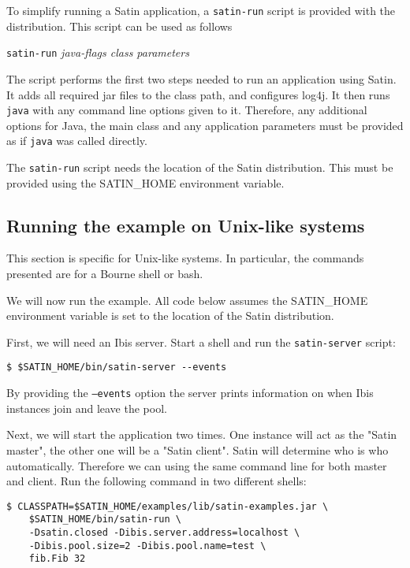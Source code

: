 \documentclass[a4paper,10pt]{article}
\begin{document}
To simplify running a Satin application, a \texttt{satin-run} script is
provided with the distribution. This script can be
used as follows

\begin{center}
\texttt{satin-run} \emph{java-flags class parameters}
\end{center}

The script performs the first two steps needed to run an application
using Satin. It adds all required jar files
to the class path, and configures log4j.
It then runs \texttt{java} with any
command line options given to it. Therefore, any additional options for
Java, the main class and any application parameters must be provided as
if \texttt{java} was called directly.

The \texttt{satin-run} script needs the location of the Satin
distribution. This must be provided using the SATIN\_HOME environment
variable.

\subsection{Running the example on Unix-like systems}

This section is specific for Unix-like systems. In particular, the
commands presented are for a Bourne shell or bash.

We will now run the example. All code below assumes the SATIN\_HOME
environment variable is set to the location of the Satin distribution.

First, we will need an Ibis server. Start a shell and
run the \texttt{satin-server} script:
\noindent
{\small
\begin{verbatim}
$ $SATIN_HOME/bin/satin-server --events
\end{verbatim}
}
\noindent

By providing the \texttt{--events} option the server
prints information on when Ibis instances join and leave the pool.

Next, we will start the application two times. One instance will act as the
"Satin master", the other one will be a "Satin client".
Satin will determine who is who automatically. Therefore we can using the same
command line for both master and client.
Run the following command in two different shells:

\noindent
{\small
\begin{verbatim}
$ CLASSPATH=$SATIN_HOME/examples/lib/satin-examples.jar \
    $SATIN_HOME/bin/satin-run \
    -Dsatin.closed -Dibis.server.address=localhost \
    -Dibis.pool.size=2 -Dibis.pool.name=test \
    fib.Fib 32
\end{verbatim}
}
\noindent
\end{document}
